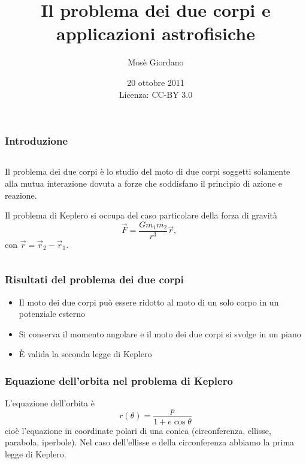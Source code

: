 \documentclass[10pt]{beamer}
\author{Mosè Giordano}
\title{Il problema dei due corpi e applicazioni astrofisiche}
\institute[UniSalento]{Università del Salento}
\date{20 ottobre 2011 \\
Licenza: CC-BY 3.0}
\newcommand{\bm}[1]{\vec{#1}}
\begin{document}
\titlepageframe{}

\begin{frame}
  \frametitle{Introduzione}
  \begin{columns}
    \begin{column}{0.5\columnwidth}
      Il \alert{problema dei due corpi} è lo studio del moto di due corpi
      soggetti solamente alla mutua interazione dovuta a forze che soddisfano il
      principio di azione e reazione.

      Il \alert{problema di Keplero} si occupa del caso particolare della forza
      di gravità
      \begin{equation*}
        \bm{F} = \frac{Gm_{1} m_{2}}{r^{3}}\bm{r},
      \end{equation*}
      con $\bm{r} = \bm{r}_{2} - \bm{r}_{1}.$
    \end{column}
    \begin{column}{0.4\columnwidth}
      \begin{tikzpicture}[tdplot_main_coords,scale=3,font=\footnotesize]
        
      \end{tikzpicture}
    \end{column}
  \end{columns}
\end{frame}

\begin{frame}
  \frametitle{Risultati del problema dei due corpi}
  \begin{itemize}[<+->]
  \item Il moto dei due corpi può essere ridotto al
    \alert{moto di un solo corpo} in un potenziale esterno
  \item Si \alert{conserva il momento angolare} e il moto dei due corpi si
    svolge in un \alert{piano} \\
    \centering
    \begin{tikzpicture}[tdplot_main_coords,scale=2.5,font=\scriptsize]
      
    \end{tikzpicture}
  \item È valida la \alert{seconda legge di Keplero}
  \end{itemize}
\end{frame}

\begin{frame}
  \frametitle{Equazione dell'orbita nel problema di Keplero}
  L'equazione dell'orbita è
  \begin{equation*}
    r(\theta) = \frac{p}{1 + e \cos\theta}
  \end{equation*}
cioè l'equazione in coordinate polari di una conica (circonferenza, ellisse,
parabola, iperbole). Nel caso dell'ellisse e della circonferenza abbiamo la
\alert{prima legge di Keplero}.
\end{frame}
\end{document}
